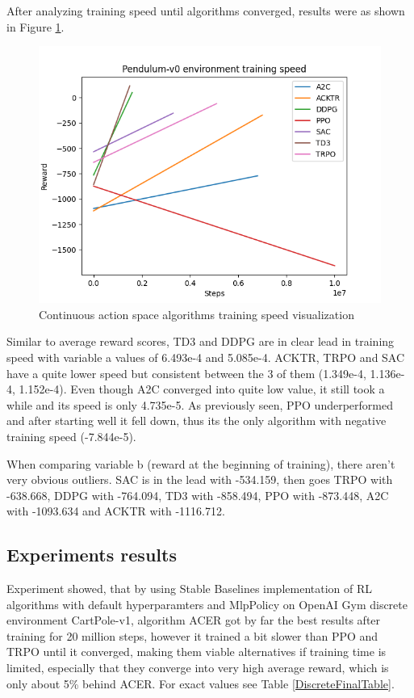 \documentclass[12pt, a4paper]{article}
\begin{document}
After analyzing training speed until algorithms converged, results were as shown in Figure \ref{ContinuousSpeedGraph}.
\begin{figure}[H]
    \centering
    \includegraphics[width=1\linewidth]{images/pendulum_results_speed.png}
    \caption{Continuous action space algorithms training speed visualization}
    \label{ContinuousSpeedGraph}
\end{figure}

Similar to average reward scores, TD3 and DDPG are in clear lead in training speed with variable a values of 6.493e-4 and 5.085e-4. ACKTR, TRPO and SAC have a quite lower speed but consistent between the 3 of them (1.349e-4, 1.136e-4, 1.152e-4). Even though A2C converged into quite low value, it still took a while and its speed is only 4.735e-5. As previously seen, PPO underperformed and after starting well it fell down, thus its the only algorithm with negative training speed (-7.844e-5).

When comparing variable b (reward at the beginning of training), there aren't very obvious outliers. SAC is in the lead with -534.159, then goes TRPO with -638.668, DDPG with -764.094, TD3 with -858.494, PPO with -873.448, A2C with -1093.634 and ACKTR with -1116.712.

\subsection{Experiments results}

Experiment showed, that by using Stable Baselines implementation of RL algorithms with default hyperparamters and MlpPolicy on OpenAI Gym discrete environment CartPole-v1, algorithm ACER got by far the best results after training for 20 million steps, however it trained a bit slower than PPO and TRPO until it converged, making them viable alternatives if training time is limited, especially that they converge into very high average reward, which is only about 5\% behind ACER. For exact values see Table \ref{DiscreteFinalTable}.
\end{document}
